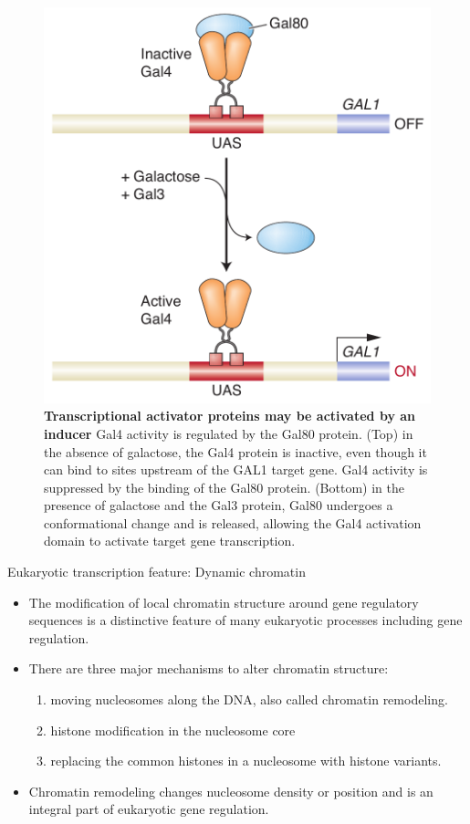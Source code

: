\documentclass[11pt,dvipsnames,ignorenonframetext,aspectratio=169]{beamer}
\providecommand{\tightlist}{%
  \setlength{\itemsep}{0pt}\setlength{\parskip}{0pt}}
\begin{document}
\begin{frame}{}
\protect\hypertarget{section-14}{}
\begin{figure}
\includegraphics[width=0.4\linewidth]{../images/transcriptional_activator_proteins_inducer} \caption{\textbf{Transcriptional activator proteins may be activated by an inducer} \newline Gal4 activity is regulated by the Gal80 protein. (Top) in the absence of galactose, the Gal4 protein is inactive, even though it can bind to sites upstream of the GAL1 target gene. Gal4 activity is suppressed by the binding of the Gal80 protein. (Bottom) in the presence of galactose and the Gal3 protein, Gal80 undergoes a conformational change and is released, allowing the Gal4 activation domain to activate target gene transcription.}\label{fig:inducer-proteins}
\end{figure}
\end{frame}

\begin{frame}{Eukaryotic transcription feature: Dynamic chromatin}
\protect\hypertarget{eukaryotic-transcription-feature-dynamic-chromatin}{}
\begin{itemize}
\tightlist
\item
  The modification of local chromatin structure around gene regulatory
  sequences is a distinctive feature of many eukaryotic processes
  including gene regulation.
\item
  There are three major mechanisms to alter chromatin structure:

  \begin{enumerate}
  \tightlist
  \item
    moving nucleosomes along the DNA, also called chromatin remodeling.
  \item
    histone modification in the nucleosome core
  \item
    replacing the common histones in a nucleosome with histone variants.
  \end{enumerate}
\item
  Chromatin remodeling changes nucleosome density or position and is an
  integral part of eukaryotic gene regulation.
\end{itemize}
\end{frame}
\end{document}
